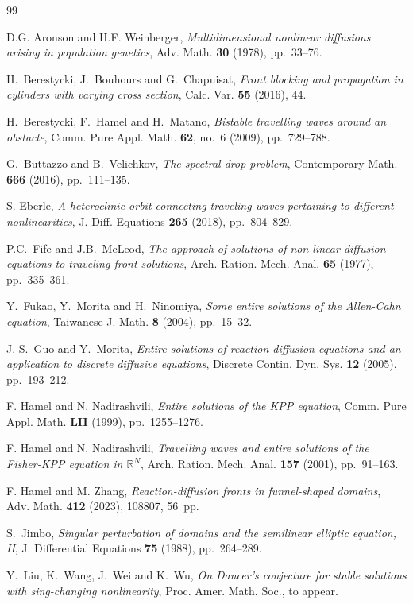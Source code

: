 \documentclass[a4paper,12pt,fullpage]{article}
\numberwithin{equation}{section}
\def\R{{\mathbb R}}
\begin{document}
\vskip 20pt
\begin{thebibliography}{99}

 D.G. Aronson and H.F. Weinberger, {\sl Multidimensional nonlinear diffusions arising in population genetics}, Adv. Math. {\bf 30} (1978), pp.~33--76.

 H.~Berestycki, J.~Bouhours and G.~Chapuisat, {\sl Front blocking and propagation in cylinders with varying cross section}, Calc. Var. {\bf 55} (2016), 44.

 H.~Berestycki, F.~Hamel and H.~Matano, {\sl Bistable travelling waves around an obstacle}, Comm. Pure Appl. Math. {\bf 62}, no.~6 (2009), pp.~729--788.

 G.~Buttazzo and B.~Velichkov, {\sl The spectral drop problem}, Contemporary Math. {\bf 666} (2016), pp.~111--135.

 S. Eberle, {\sl A heteroclinic orbit connecting traveling waves pertaining to different nonlinearities}, J. Diff. Equations {\bf 265} (2018), pp.~804--829.

 P.C.~Fife and J.B.~McLeod, {\sl The approach of solutions of non-linear diffusion equations to traveling front solutions}, Arch. Ration. Mech. Anal. {\bf 65} (1977), pp.~335--361.

 Y.~Fukao, Y.~Morita and H.~Ninomiya, {\sl Some entire solutions of the Allen-Cahn equation}, Taiwanese J. Math. {\bf 8} (2004), pp.~15--32.

 J.-S.~Guo and Y.~Morita, {\sl Entire solutions of reaction diffusion equations and an application to discrete diffusive equations}, Discrete Contin. Dyn. Sys. {\bf 12} (2005), pp.~193--212.

 F. Hamel and N. Nadirashvili, {\sl Entire solutions of the KPP equation}, Comm. Pure Appl. Math. {\bf LII} (1999), pp.~1255--1276.

  F. Hamel and N. Nadirashvili, {\sl Travelling waves and entire solutions of the Fisher-KPP equation in $\R^N$}, Arch. Ration. Mech. Anal. {\bf 157} (2001), pp.~91--163.

 F. Hamel and M. Zhang, {\sl Reaction-diffusion fronts in funnel-shaped domains}, Adv. Math. {\bf 412} (2023), 108807, 56~pp.

 S.~Jimbo, {\sl Singular perturbation of domains and the semilinear elliptic equation, II}, J. Differential Equations {\bf 75} (1988), pp.~264--289.

 Y.~Liu, K.~Wang, J.~Wei and K.~Wu, {\sl On Dancer's conjecture for stable solutions with sing-changing nonlinearity}, Proc. Amer. Math. Soc., to appear.


\end{thebibliography}
\end{document}
